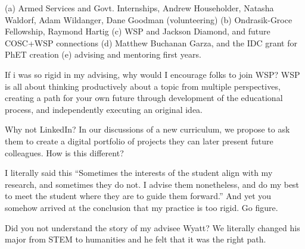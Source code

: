 \documentclass[../../main.tex]{subfiles}
\begin{document}
(a) Armed Services and Govt. Internships, Andrew Householder, Natasha Waldorf, Adam Wildanger, Dane Goodman (volunteering) (b) Ondrasik-Groce Fellowship, Raymond Hartig (c) WSP and Jackson Diamond, and future COSC+WSP connections (d) Matthew Buchanan Garza, and the IDC grant for PhET creation (e) advising and mentoring first years.

If i was so rigid in my advising, why would I encourage folks to join WSP?  WSP is all about thinking productively about a topic from multiple perspectives, creating a path for your own future through development of the educational process, and independently executing an original idea. 

Why not LinkedIn?  In our discussions of a new curriculum, we propose to ask them to create a digital portfolio of projects they can later present future colleagues.  How is this different?

I literally said this ``Sometimes the interests of the student align with my research, and sometimes they do not. I
advise them nonetheless, and do my best to meet the student where they are to guide them forward.'' And yet you somehow arrived at the conclusion that my practice is too rigid.  Go figure.

Did you not understand the story of my advisee Wyatt?  We literally changed his major from STEM to humanities and he felt that it was the right path.
\end{document}
